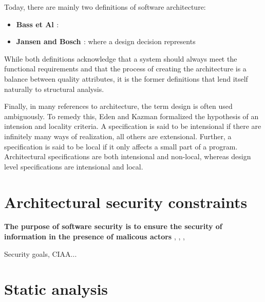 Today, there are mainly two definitions of software architecture:

\begin{itemize}
    \item \textbf{Bass et Al \cite{bass_software_2013}}: 
    \item \textbf{Jansen and Bosch \cite{jansen_software_2005}}:  where a design decision represents 
\end{itemize}

While both definitions acknowledge that a system should always meet the functional requirements and that the process of creating the architecture is a balance between quality attributes, it is the former definitions that lend itself naturally to structural analysis.

Finally, in many references to architecture, the term design is often used ambiguously. To remedy this, Eden and Kazman \cite{eden_architecture_2003} formalized the hypothesis of an intension and locality criteria. A specification is said to be intensional if there are infinitely many ways of realization, all others are extensional. Further, a specification is said to be local if it only affects a small part of a program. Architectural specifications are both intensional and non-local, whereas design level specifications are intensional and local.

\section{Architectural security constraints}

\textbf{The purpose of software security is to ensure the security of information in the presence of malicous actors}
\cite{broy_software_2007}, \cite{felderer_security_2016}, \cite{haley_security_2008}, 

Security goals, CIAA...

\section{Static analysis}

